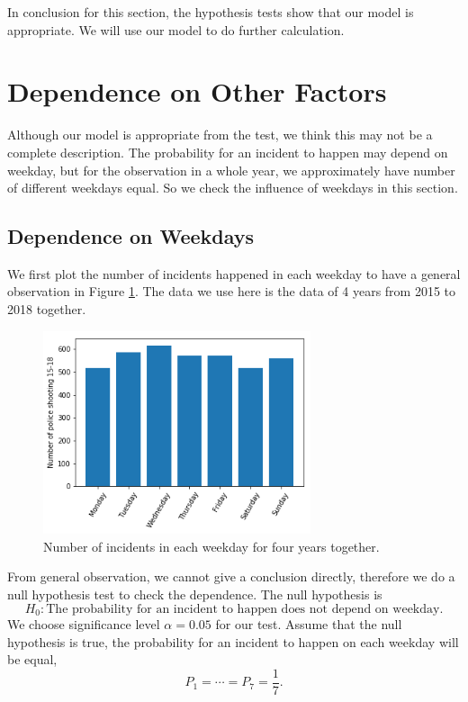 \documentclass[11pt,a4paper,english]{article}
\begin{document}
In conclusion for this section, the hypothesis tests show that our model is appropriate. We will use our model to do further calculation.

\section{Dependence on Other Factors}
Although our model is appropriate from the test, we think this may not be a complete description. 
The probability for an incident to happen may depend on weekday, but for the observation in a whole year, we approximately have number of different weekdays equal. 
So we check the influence of weekdays in this section.

\subsection{Dependence on Weekdays}
We first plot the number of incidents happened in each weekday to have a general observation in Figure \ref{fig:weekdays}. The data we use here is the data of 4 years from 2015 to 2018 together.
\begin{figure}[htbp]
	\centering
	\includegraphics[width=0.7\textwidth]{weekdays.png}
	\caption{Number of incidents in each weekday for four years together.}
	\label{fig:weekdays}
\end{figure}
From general observation, we cannot give a conclusion directly,
therefore we do a null hypothesis test to check the dependence.
The null hypothesis is
\begin{equation*}
	H_{0}:
	\text{The probability for an incident to happen does not depend on weekday.}
\end{equation*} 
We choose significance level $\alpha = 0.05$ for our test.
Assume that the null hypothesis is true, the probability for an incident to happen on each weekday will be equal,
\begin{equation*}
	P_{1} = \cdots = P_{7} = \frac{1}{7}.
\end{equation*}
\end{document}
